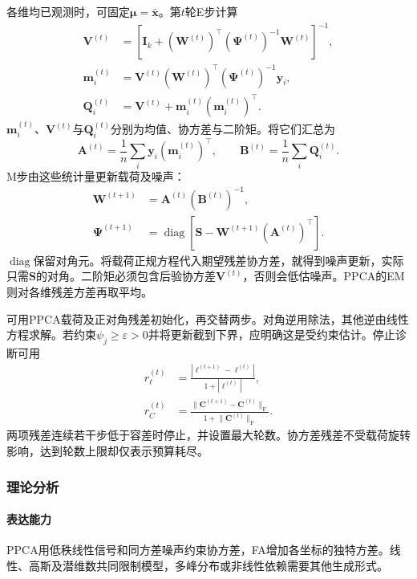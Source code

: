 各维均已观测时，可固定$\bm{\mu}=\bar{\bm{x}}$。第$t$轮E步计算
\begin{equation}
\label{eq:dim-fa-estep}
\begin{aligned}
\bm{V}^{(t)}
&=\left[\bm{I}_k+
(\bm{W}^{(t)})^\top(\bm{\Psi}^{(t)})^{-1}
\bm{W}^{(t)}\right]^{-1},\\
\bm{m}_i^{(t)}
&=\bm{V}^{(t)}(\bm{W}^{(t)})^\top
(\bm{\Psi}^{(t)})^{-1}\bm{y}_i,\\
\bm{Q}_i^{(t)}
&=\bm{V}^{(t)}+\bm{m}_i^{(t)}(\bm{m}_i^{(t)})^\top.
\end{aligned}
\end{equation}
$\bm{m}_i^{(t)}$、$\bm{V}^{(t)}$与$\bm{Q}_i^{(t)}$分别为均值、协方差与二阶矩。将它们汇总为
\[
\bm{A}^{(t)}=\frac1n\sum_i\bm{y}_i(\bm{m}_i^{(t)})^\top,
\qquad
\bm{B}^{(t)}=\frac1n\sum_i\bm{Q}_i^{(t)}.
\]
M步由这些统计量更新载荷及噪声：
\begin{equation}
\label{eq:dim-fa-mstep}
\begin{aligned}
\bm{W}^{(t+1)}&=\bm{A}^{(t)}(\bm{B}^{(t)})^{-1},\\
\bm{\Psi}^{(t+1)}
&=\operatorname{diag}\left[
\bm{S}-\bm{W}^{(t+1)}(\bm{A}^{(t)})^\top
\right].
\end{aligned}
\end{equation}
$\operatorname{diag}$保留对角元。将载荷正规方程代入期望残差协方差，就得到噪声更新，实际只需$\bm{S}$的对角。二阶矩必须包含后验协方差$\bm{V}^{(t)}$，否则会低估噪声。PPCA的EM则对各维残差方差再取平均。

可用PPCA载荷及正对角残差初始化，再交替两步。对角逆用除法，其他逆由线性方程求解。若约束$\psi_j\geq\varepsilon>0$并将更新截到下界，应明确这是受约束估计。停止诊断可用
\begin{equation}
\label{eq:dim-fa-stopping}
\begin{aligned}
r_\ell^{(t)}
&=\frac{|\ell^{(t+1)}-\ell^{(t)}|}{1+|\ell^{(t)}|},\\
r_C^{(t)}
&=\frac{\lVert\bm{C}^{(t+1)}-\bm{C}^{(t)}\rVert_{\mathrm{F}}}
{1+\lVert\bm{C}^{(t)}\rVert_{\mathrm{F}}}.
\end{aligned}
\end{equation}
两项残差连续若干步低于容差时停止，并设置最大轮数。协方差残差不受载荷旋转影响，达到轮数上限却仅表示预算耗尽。

\subsubsection{理论分析}
\label{sec:dim-ppca-analysis}

\paragraph{表达能力}
PPCA用低秩线性信号和同方差噪声约束协方差，FA增加各坐标的独特方差。线性、高斯及潜维数共同限制模型，多峰分布或非线性依赖需要其他生成形式。


